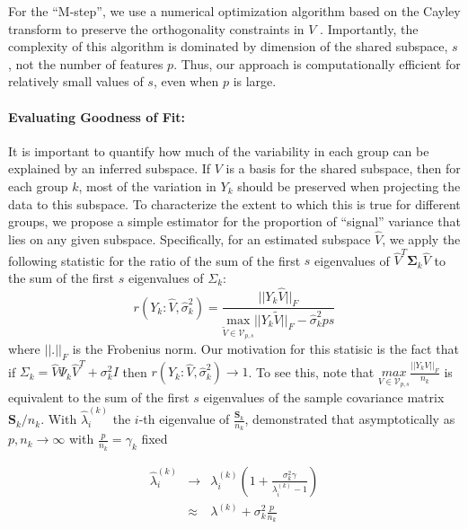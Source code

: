 \documentclass[12pt]{article}
\newcommand{\bl}[1]{{\mathbf #1}}
\begin{document}
For the ``M-step'', we use a numerical optimization algorithm based on
the Cayley transform to preserve the orthogonality constraints in $V$
\citep{Wen2013}.  Importantly, the complexity of this algorithm is
dominated by dimension of the shared subspace, $s$, not the number of
features $p$.  Thus, our approach is computationally efficient for
relatively small values of $s$, even when $p$ is large.

\paragraph{Evaluating Goodness of Fit:}

It is important to quantify how much of the variability in each group can be
explained by an inferred subspace.  If $V$ is a basis for
the shared subspace, then for each group $k$, most of the variation in
$Y_k$ should be preserved when projecting the data to this subspace.
To characterize the extent to which this is true for different groups, we
propose a simple estimator for the proportion of ``signal'' variance
that lies on any given subspace.  Specifically, for an estimated
subspace $\hat{V}$, we apply the following statistic for the ratio of the
sum of the first $s$ eigenvalues of $\hat{V}^T\bl \Sigma_k \hat{V}$ to
the sum of the first $s$ eigenvalues of $\Sigma_k$:
%
\begin{equation}
r(Y_k: \hat{V}, \hat{\sigma}_k^2) = \frac{||Y_k\hat{V}||_F}{\underset{\widetilde{V} \in \mathcal{V}_{p, s}}{\text{max}}
  ||Y_k\widetilde{V}||_F - \hat{\sigma}_k^2ps}
\label{eqn:ratio}
\end{equation}
%
\noindent where $||.||_F$ is the Frobenius norm. Our motivation for
this statisic is the fact that if
$\Sigma_k = \hat{V}\Psi_k\hat{V}^T + \sigma_k^2I$ then
$r(Y_k: \hat{V}, \hat{\sigma}_k^2) \rightarrow 1$.  To see this, note
that $\underset{V \in \mathcal{V}_{p, s}}{max}\frac{||Y_kV||_F}{n_k}$
is equivalent to the sum of the first $s$ eigenvalues of the sample
covariance matrix $\bl S_k/n_k$.  With $\hat{\lambda}^{(k)}_i$
the $i$-th eigenvalue of $\frac{\bl S_k}{n_k}$, \citet{Baik2006}
demonstrated that asymptotically as $p, n_k \rightarrow \infty$ with
$\frac{p}{n_k} = \gamma_k$ fixed

\begin{eqnarray}
\hat{\lambda}^{(k)}_i &\rightarrow& \lambda^{(k)}_i\left(1 +
                                    \frac{\sigma_k^2\gamma}{\lambda^{(k)}_i
                                    - 1}\right)\\
& \approx& \lambda^{(k)} + \sigma^2_k\frac{p}{n_k}
\end{eqnarray}
\end{document}
